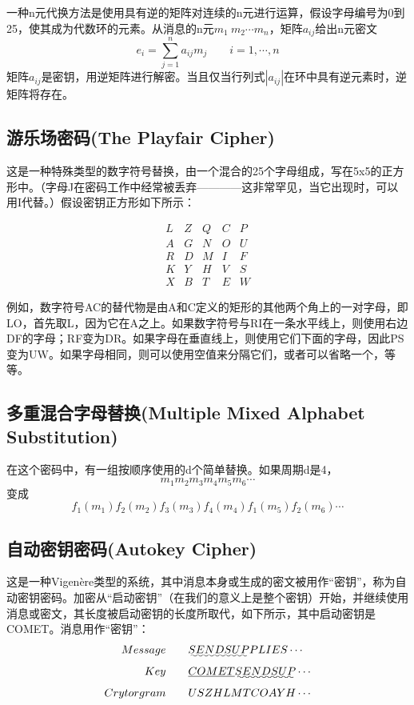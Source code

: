 \documentclass[]{article}
\begin{document}
一种n元代换方法是使用具有逆的矩阵对连续的n元进行运算，假设字母编号为0到25，使其成为代数环的元素。从消息的n元$m_1\ m_2\cdots m_n$，矩阵$a_{ij}$给出n元密文
\[e_i=\sum_{j=1}^{n}a_{ij}m_j\qquad i=1,\cdots,n\]
矩阵$a_{ij}$是密钥，用逆矩阵进行解密。当且仅当行列式$|a_{ij}|$在环中具有逆元素时，逆矩阵将存在。


\subsection{游乐场密码(The Playfair Cipher)}

这是一种特殊类型的数字符号替换，由一个混合的25个字母组成，写在5x5的正方形中。（字母J在密码工作中经常被丢弃————这非常罕见，当它出现时，可以用I代替。）假设密钥正方形如下所示：

\begin{equation}
	\begin{array}{ccccc}
	L &Z &Q &C &P\\
	A &G &N &O &U\\
	R &D &M &I &F\\
	K &Y &H &V &S\\
	X &B &T &E &W \nonumber
	\end{array} 
\end{equation}


例如，数字符号AC的替代物是由A和C定义的矩形的其他两个角上的一对字母，即LO，首先取L，因为它在A之上。如果数字符号与RI在一条水平线上，则使用右边DF的字母；RF变为DR。如果字母在垂直线上，则使用它们下面的字母，因此PS变为UW。如果字母相同，则可以使用空值来分隔它们，或者可以省略一个，等等。

\subsection{多重混合字母替换(Multiple Mixed Alphabet Substitution)}
在这个密码中，有一组按顺序使用的d个简单替换。如果周期d是4，
\[m_1m_2m_3m_4m_5m_6\cdots\]
变成
\[f_1(m_1)f_2(m_2)f_3(m_3)f_4(m_4)f_1(m_5)f_2(m_6)\cdots\]


\subsection{自动密钥密码(Autokey Cipher)}

这是一种Vigen\`{e}re类型的系统，其中消息本身或生成的密文被用作“密钥”，称为自动密钥密码。加密从“启动密钥”（在我们的意义上是整个密钥）开始，并继续使用消息或密文，其长度被启动密钥的长度所取代，如下所示，其中启动密钥是COMET。消息用作“密钥”：
\begin{equation}
	\begin{aligned}
	Message\qquad    &\uwave{SENDSUP}PLIES\cdots \\
	Key\qquad        &\underline{COMET}\uwave{SENDSUP}\cdots \\
	Crytorgram\qquad &USZHLMTCOAYH\cdots \nonumber
	\end{aligned}
\end{equation}
\end{document}
